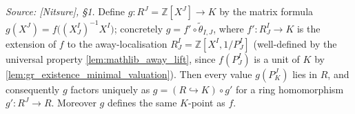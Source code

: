 \begin{lemma}

  \label{lem:gr_existence_factor_through_valuation_ring}
  \textit{Source: [Nitsure], \S 1.}
  Define \(g : R^J = \mathbb{Z}[X^J] \to K\) by the matrix formula \(g(X^J) =
  f\bigl((X^I_J)^{-1} X^I\bigr)\); concretely \(g = f' \circ \tilde\theta_{I,J}\),
  where \(f' : R^I_J \to K\) is the extension of \(f\) to the away-localisation
  \(R^I_J = \mathbb{Z}[X^I, 1/P^I_J]\) (well-defined by the universal property
  \cref{lem:mathlib_away_lift}, since \(f(P^I_J)\) is a unit of \(K\) by
  \cref{lem:gr_existence_minimal_valuation}). Then every value \(g(P^J_K)\) lies in
  \(R\), and consequently \(g\) factors uniquely as \(g = (R \hookrightarrow K)
  \circ g'\) for a ring homomorphism \(g' : R^J \to R\). Moreover \(g\) defines the
  same \(K\)-point as \(f\).
\end{lemma}
